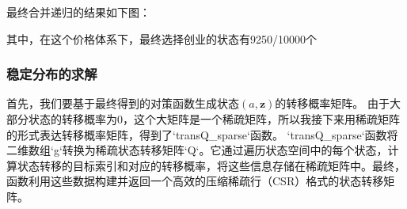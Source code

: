 \documentclass[a4paper, 12pt]{ctexart}
\begin{document}
最终合并递归的结果如下图：
\begin{figure}[h]
    \centering
    \nonumber
\end{figure}
其中，在这个价格体系下，最终选择创业的状态有9250/10000个
\subsubsection{稳定分布的求解}
首先，我们要基于最终得到的对策函数生成状态$(a,\mathbf{z})$的转移概率矩阵。
由于大部分状态的转移概率为0，这个大矩阵是一个稀疏矩阵，所以我接下来用稀疏矩阵的形式表达转移概率矩阵，得到了`transQ\_sparse`函数。
`transQ\_sparse`函数将二维数组`g`转换为稀疏状态转移矩阵`Q`。它通过遍历状态空间中的每个状态，计算状态转移的目标索引和对应的转移概率，将这些信息存储在稀疏矩阵中。最终，函数利用这些数据构建并返回一个高效的压缩稀疏行（CSR）格式的状态转移矩阵。
\end{document}

